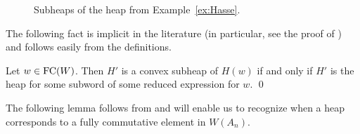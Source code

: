 \begin{figure}[!h]
\centering
\begin{subfigure}[b]{0.3\textwidth}
\centering
{}
\caption{}
\label{fig:subheap}
\end{subfigure}
\begin{subfigure}[b]{0.3\textwidth}
\centering
{}
\caption{}
\label{fig:heapheap}
\end{subfigure}
\caption{Subheaps of the heap from Example~\ref{ex:Hasse}.}
\label{fig:144}
\end{figure}


The following fact is implicit in the literature (in particular, see the proof of \cite[Proposition 3.3]{Stembridge1996}) and follows easily from the definitions.

\begin{proposition}
Let $w \in \operatorname{FC}(W)$.  Then $H'$ is a convex subheap of $H(w)$ if and only if $H'$ is the heap for some subword of some reduced expression for $w$.   
\qed
\end{proposition}

The following lemma follows from \cite[Lemma 2.4.5]{Ernst2010a} and will enable us to recognize when a heap corresponds to a fully commutative element in $W(A_{n})$.  

